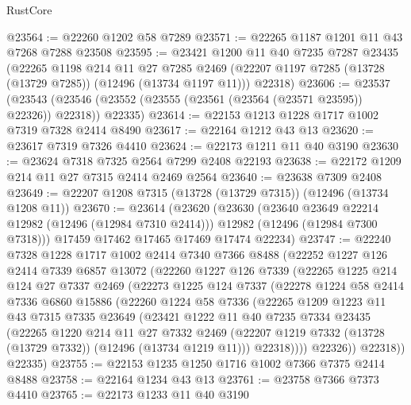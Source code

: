 \begin{lexlean}{RustCore}
\begin{coremodule}
@23564 := @22260 @1202 @58 @7289
@23571 := @22265 @1187 @1201 @11 @43 @7268 @7288 @23508
@23595 := @23421
    @1200
    @11
    @40
    @7235
    @7287
    @23435
    (@22265
      @1198
      @214
      @11
      @27
      @7285
      @2469
      (@22207 @1197 @7285 (@13728 (@13729 @7285)) (@12496 (@13734 @1197 @11)))
      @22318)
@23606 := @23537
    (@23543 (@23546 (@23552 (@23555 (@23561 (@23564 (@23571 @23595)) @22326)) @22318)) @22335)
@23614 := @22153 @1213 @1228 @1717 @1002 @7319 @7328 @2414 @8490
@23617 := @22164 @1212 @43 @13
@23620 := @23617 @7319 @7326 @4410
@23624 := @22173 @1211 @11 @40 @3190
@23630 := @23624 @7318 @7325 @2564 @7299 @2408 @22193
@23638 := @22172 @1209 @214 @11 @27 @7315 @2414 @2469 @2564
@23640 := @23638 @7309 @2408
@23649 := @22207 @1208 @7315 (@13728 (@13729 @7315)) (@12496 (@13734 @1208 @11))
@23670 := @23614
    (@23620
      (@23630
        (@23640 @23649 @22214 @12982 (@12496 (@12984 @7310 @2414)))
        @12982
        (@12496 (@12984 @7300 @7318)))
      @17459
      @17462
      @17465
      @17469
      @17474
      @22234)
@23747 := @22240
    @7328
    @1228
    @1717
    @1002
    @2414
    @7340
    @7366
    @8488
    (@22252
      @1227
      @126
      @2414
      @7339
      @6857
      @13072
      (@22260
        @1227
        @126
        @7339
        (@22265
          @1225
          @214
          @124
          @27
          @7337
          @2469
          (@22273
            @1225
            @124
            @7337
            (@22278
              @1224
              @58
              @2414
              @7336
              @6860
              @15886
              (@22260
                @1224
                @58
                @7336
                (@22265
                  @1209
                  @1223
                  @11
                  @43
                  @7315
                  @7335
                  @23649
                  (@23421
                    @1222
                    @11
                    @40
                    @7235
                    @7334
                    @23435
                    (@22265
                      @1220
                      @214
                      @11
                      @27
                      @7332
                      @2469
                      (@22207 @1219 @7332 (@13728 (@13729 @7332)) (@12496 (@13734 @1219 @11)))
                      @22318))))
              @22326))
          @22318))
      @22335)
@23755 := @22153 @1235 @1250 @1716 @1002 @7366 @7375 @2414 @8488
@23758 := @22164 @1234 @43 @13
@23761 := @23758 @7366 @7373 @4410
@23765 := @22173 @1233 @11 @40 @3190

\end{coremodule}
\end{lexlean}
